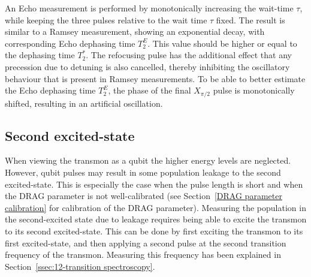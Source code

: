           An Echo measurement is performed by monotonically increasing the wait-time $\tau$, while keeping the three pulses relative to the wait time $\tau$ fixed. The result is similar to a Ramsey measurement, showing an exponential decay, with corresponding Echo dephasing time $T_2^E$. This value should be higher or equal to the dephasing time $T_2^*$. The refocusing pulse has the additional effect that any precession due to detuning is also cancelled, thereby inhibiting the oscillatory behaviour that is present in Ramsey measurements. To be able to better estimate the Echo dephasing time $T_2^E$, the phase of the final $X_{\pi/2}$ pulse is monotonically shifted, resulting in an artificial oscillation.

      \subsection{Second excited-state}
        \label{ssec:Second excited-state}
        When viewing the transmon as a qubit the higher energy levels are neglected. However, qubit pulses may result in some population leakage to the second excited-state. This is especially the case when the pulse length is short and when the DRAG parameter is not well-calibrated (see Section~\ref{DRAG parameter calibration} for calibration of the DRAG parameter). Measuring the population in the second-excited state due to leakage requires being able to excite the transmon to its second excited-state. This can be done by first exciting the transmon to its first excited-state, and then applying a second pulse at the second transition frequency of the transmon. Measuring this frequency has been explained in Section~\ref{ssec:12-transition spectroscopy}.

